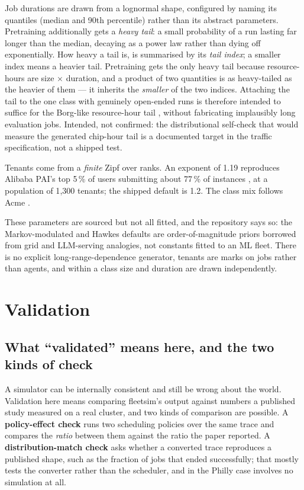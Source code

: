 Job durations are drawn from a lognormal shape, configured by naming its
quantiles (median and 90th percentile) rather than its abstract parameters.
Pretraining additionally gets a \emph{heavy tail}: a small probability of a run
lasting far longer than the median, decaying as a power law rather than dying
off exponentially. How heavy a tail is, is summarised by its \emph{tail index};
a smaller index means a heavier tail. Pretraining gets the only heavy tail
because resource-hours are size $\times$ duration, and a product of two
quantities is as heavy-tailed as the heavier of them --- it inherits the
\emph{smaller} of the two indices. Attaching the tail to the one class with
genuinely open-ended runs is therefore intended to suffice for the Borg-like
resource-hour tail \cite{borgtng2020}, without fabricating implausibly long
evaluation jobs. Intended, not confirmed: the distributional self-check that
would measure the generated chip-hour tail is a documented target in the traffic
specification, not a shipped test.

Tenants come from a \emph{finite} Zipf over ranks. An exponent of 1.19
reproduces Alibaba PAI's top 5\,\% of users submitting about 77\,\% of
instances \cite{alibabapai2022}, at a population of 1{,}300 tenants; the shipped
default is 1.2. The class mix follows Acme \cite{acme2024}.

These parameters are sourced but not all fitted, and the repository says so: the
Markov-modulated and Hawkes defaults are order-of-magnitude priors borrowed from
grid and LLM-serving analogies, not constants fitted to an ML fleet. There is no
explicit long-range-dependence generator, tenants are marks on jobs rather than
agents, and within a class size and duration are drawn independently.

\section{Validation}
\label{sec:validation}

\subsection{What ``validated'' means here, and the two kinds of check}
\label{sec:val-kinds}

A simulator can be internally consistent and still be wrong about the world.
Validation here means comparing fleetsim's output against numbers a published
study measured on a real cluster, and two kinds of comparison are possible. A
\textbf{policy-effect check} runs two scheduling policies over the same trace and
compares the \emph{ratio} between them against the ratio the paper reported. A
\textbf{distribution-match check} asks whether a converted trace reproduces a
published shape, such as the fraction of jobs that ended successfully; that
mostly tests the converter rather than the scheduler, and in the Philly case
involves no simulation at all.

